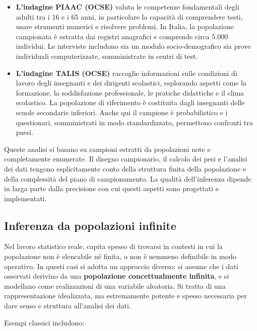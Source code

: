 \documentclass[
  11pt,
]{book}
\theoremstyle{mytheoremstyle}
\theoremstyle{mydefstyle}
\begin{document}
\begin{itemize}
\item
  \textbf{L'indagine PIAAC (OCSE)} valuta le competenze fondamentali degli adulti tra i 16 e i 65 anni, in particolare la capacità di comprendere testi, usare strumenti numerici e risolvere problemi. In Italia, la popolazione campionata è estratta dai registri anagrafici e comprende circa 5.000 individui. Le interviste includono sia un modulo socio-demografico sia prove individuali computerizzate, somministrate in centri di test.
\item
  \textbf{L'indagine TALIS (OCSE)} raccoglie informazioni sulle condizioni di lavoro degli insegnanti e dei dirigenti scolastici, esplorando aspetti come la formazione, la soddisfazione professionale, le pratiche didattiche e il clima scolastico. La popolazione di riferimento è costituita dagli insegnanti delle scuole secondarie inferiori. Anche qui il campione è probabilistico e i questionari, somministrati in modo standardizzato, permettono confronti tra paesi.
\end{itemize}

Queste analisi si basano su campioni estratti da popolazioni note e completamente enumerate. Il disegno campionario, il calcolo dei pesi e l'analisi dei dati tengono esplicitamente conto della struttura finita della popolazione e della complessità del piano di campionamento. La qualità dell'inferenza dipende in larga parte dalla precisione con cui questi aspetti sono progettati e implementati.

\subsection{Inferenza da popolazioni infinite}\label{inferenza-da-popolazioni-infinite}

Nel lavoro statistico reale, capita spesso di trovarsi in contesti in cui la popolazione non è elencabile né finita, o non è nemmeno definibile in modo operativo. In questi casi si adotta un approccio diverso: si assume che i dati osservati derivino da una \textbf{popolazione concettualmente infinita}, e si modellano come realizzazioni di una variabile aleatoria. Si tratta di una rappresentazione idealizzata, ma estremamente potente e spesso necessaria per dare senso e struttura all'analisi dei dati.

Esempi classici includono:
\end{document}
